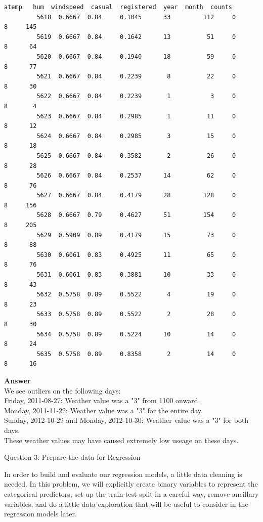 \documentclass[11pt]{article}
\begin{document}
\begin{Verbatim}[commandchars=\\\{\}]
                atemp   hum  windspeed  casual  registered  year  month  counts  
         5618  0.6667  0.84     0.1045      33         112     0      8     145  
         5619  0.6667  0.84     0.1642      13          51     0      8      64  
         5620  0.6667  0.84     0.1940      18          59     0      8      77  
         5621  0.6667  0.84     0.2239       8          22     0      8      30  
         5622  0.6667  0.84     0.2239       1           3     0      8       4  
         5623  0.6667  0.84     0.2985       1          11     0      8      12  
         5624  0.6667  0.84     0.2985       3          15     0      8      18  
         5625  0.6667  0.84     0.3582       2          26     0      8      28  
         5626  0.6667  0.84     0.2537      14          62     0      8      76  
         5627  0.6667  0.84     0.4179      28         128     0      8     156  
         5628  0.6667  0.79     0.4627      51         154     0      8     205  
         5629  0.5909  0.89     0.4179      15          73     0      8      88  
         5630  0.6061  0.83     0.4925      11          65     0      8      76  
         5631  0.6061  0.83     0.3881      10          33     0      8      43  
         5632  0.5758  0.89     0.5522       4          19     0      8      23  
         5633  0.5758  0.89     0.5522       2          28     0      8      30  
         5634  0.5758  0.89     0.5224      10          14     0      8      24  
         5635  0.5758  0.89     0.8358       2          14     0      8      16  
\end{Verbatim}
            
    \textbf{Answer}\\
We see outliers on the following days:\\
Friday, 2011-08-27: Weather value was a "3" from 1100 onward.\\
Monday, 2011-11-22: Weather value was a "3" for the entire day.\\
Sunday, 2012-10-29 and Monday, 2012-10-30: Weather value was a "3" for
both days.\\
These weather values may have caused extremely low useage on these days.

     Question 3: Prepare the data for Regression

In order to build and evaluate our regression models, a little data
cleaning is needed. In this problem, we will explicitly create binary
variables to represent the categorical predictors, set up the train-test
split in a careful way, remove ancillary variables, and do a little data
exploration that will be useful to consider in the regression models
later.
\end{document}
